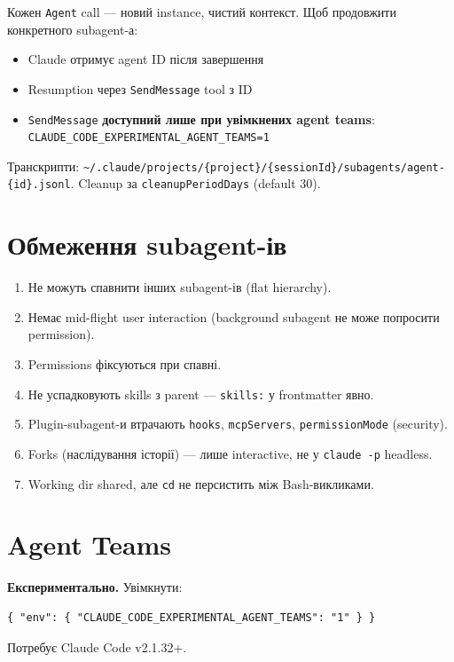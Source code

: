 \documentclass[11pt,a4paper]{article}
\begin{document}
Кожен \texttt{Agent} call --- новий instance, чистий контекст. Щоб продовжити конкретного subagent-а:

\begin{itemize}
  \item Claude отримує agent ID після завершення
  \item Resumption через \texttt{SendMessage} tool з ID
  \item \texttt{SendMessage} \textbf{доступний лише при увімкнених agent teams}: \texttt{CLAUDE\_CODE\_EXPERIMENTAL\_AGENT\_TEAMS=1}
\end{itemize}

Транскрипти: \texttt{\textasciitilde/.claude/projects/\{project\}/\{sessionId\}/subagents/agent-\{id\}.jsonl}. Cleanup за \texttt{cleanupPeriodDays} (default 30).

\section{Обмеження subagent-ів}

\begin{enumerate}
  \item Не можуть спавнити інших subagent-ів (flat hierarchy).
  \item Немає mid-flight user interaction (background subagent не може попросити permission).
  \item Permissions фіксуються при спавні.
  \item Не успадковують skills з parent --- \texttt{skills:} у frontmatter явно.
  \item Plugin-subagent-и втрачають \texttt{hooks}, \texttt{mcpServers}, \texttt{permissionMode} (security).
  \item Forks (наслідування історії) --- лише interactive, не у \texttt{claude -p} headless.
  \item Working dir shared, але \texttt{cd} не персистить між Bash-викликами.
\end{enumerate}

\section{Agent Teams}

\textbf{Експериментально.} Увімкнути:
\begin{lstlisting}
{ "env": { "CLAUDE_CODE_EXPERIMENTAL_AGENT_TEAMS": "1" } }
\end{lstlisting}

Потребує Claude Code v2.1.32+.
\end{document}
